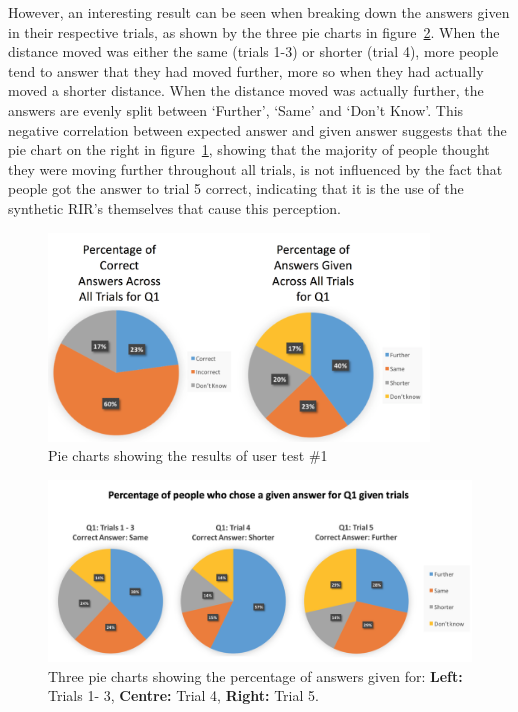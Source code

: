 \documentclass[../../main.tex]{subfiles}
\begin{document}
			However, an interesting result can be seen when breaking down the answers given in their respective trials, as shown by the three pie charts in figure~\ref{Q1Trials}. When the distance moved was either the same (trials 1-3) or shorter (trial 4), more people tend to answer that they had moved further, more so when they had actually moved a shorter distance. When the distance moved was actually further, the answers are evenly split between `Further', `Same' and `Don't Know'. This negative correlation between expected answer and given answer suggests that the pie chart on the right in figure~\ref{test1Results}, showing that the majority of people thought they were moving further throughout all trials, is not influenced by the fact that people got the answer to trial 5 correct, indicating that it is the use of the synthetic \ac{RIR}'s themselves that cause this perception.

			\begin{figure}[p]
				\centerline{\includegraphics[width=0.9\textwidth]{Sections/userTesting/images/test1/Q1Pies.png}}
				\caption{Pie charts showing the results of user test \#1}
				\label{test1Results}
			\end{figure}	


			\begin{figure}[p]
				\centerline{\includegraphics[width=\textwidth]{Sections/userTesting/images/test1/Q1Trials.png}}
				\caption{Three pie charts showing the percentage of answers given for: \textbf{Left:} Trials 1- 3, \textbf{Centre:} Trial 4, \textbf{Right:} Trial 5.}
				\label{Q1Trials}
			\end{figure}
\end{document}
